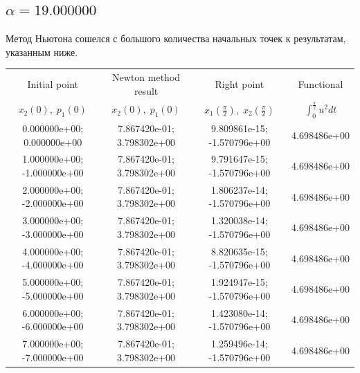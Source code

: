\documentclass[titlepage]{article}
\def\l{\left}
\def\r{\right}
\begin{document}
\subsection{$\alpha = 19.000000$} 
Метод Ньютона сошелся с большого количества начальных точек к результатам, указанным ниже. \\ 
\begin{tabular}{ | c | c | c | c |} 
\hline 
Initial point  & Newton method result & Right point & Functional 
 \\ $x_2(0), \; p_1(0)$ & $x_2(0), \; p_1(0)$ & $x_1\l(\frac{\pi}{2}\r), \; x_2\l(\frac{\pi}{2}\r)$ & $\int_{0}^{\frac{\pi}{2}}u^2dt$  \\ \hline 
0.000000e+00; 0.000000e+00 & 7.867420e-01; 3.798302e+00 & 9.809861e-15; -1.570796e+00 & 4.698486e+00 \\ \hline 
1.000000e+00; -1.000000e+00 & 7.867420e-01; 3.798302e+00 & 9.791647e-15; -1.570796e+00 & 4.698486e+00 \\ \hline 
2.000000e+00; -2.000000e+00 & 7.867420e-01; 3.798302e+00 & 1.806237e-14; -1.570796e+00 & 4.698486e+00 \\ \hline 
3.000000e+00; -3.000000e+00 & 7.867420e-01; 3.798302e+00 & 1.320038e-14; -1.570796e+00 & 4.698486e+00 \\ \hline 
4.000000e+00; -4.000000e+00 & 7.867420e-01; 3.798302e+00 & 8.820635e-15; -1.570796e+00 & 4.698486e+00 \\ \hline 
5.000000e+00; -5.000000e+00 & 7.867420e-01; 3.798302e+00 & 1.924947e-15; -1.570796e+00 & 4.698486e+00 \\ \hline 
6.000000e+00; -6.000000e+00 & 7.867420e-01; 3.798302e+00 & 1.423080e-14; -1.570796e+00 & 4.698486e+00 \\ \hline 
7.000000e+00; -7.000000e+00 & 7.867420e-01; 3.798302e+00 & 1.259496e-14; -1.570796e+00 & 4.698486e+00 \\ \hline 
\end{tabular} 
\end{document}
